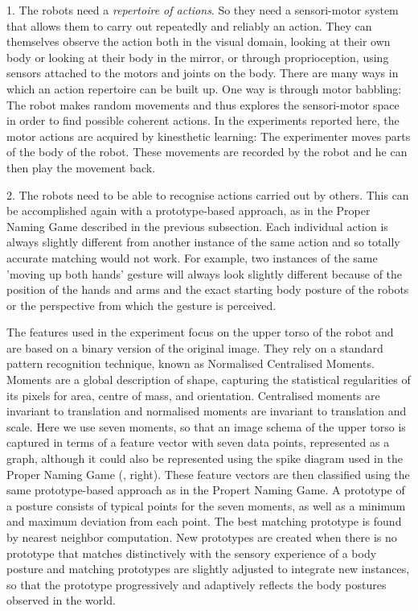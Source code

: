 1. The robots need a {\itshape repertoire of actions}. So they need a sensori-motor system that allows them to carry out 
repeatedly and reliably an action. They can themselves observe the action both in the visual domain,  
looking at their own body or looking at their body in the mirror, or through proprioception, using sensors attached 
to the motors and joints on the body. There are many ways in which an action repertoire can be built up. One way 
is through motor babbling: The robot makes random movements and thus explores the sensori-motor 
space in order to find possible coherent actions. In the experiments reported here, the motor actions are acquired 
by kinesthetic learning: The experimenter moves parts of the body of the robot. These movements are recorded by the robot
and he can then play the movement back. 

2. The robots need to be able to recognise actions carried out by others. This can be accomplished again 
with a prototype-based approach, as in the Proper Naming Game described in the previous subsection. Each individual action 
is always slightly different from another instance of the same action and so totally accurate matching would not work. 
For example, two instances of the same 'moving up both hands' gesture will always look slightly different because of the 
position of the hands and arms and the exact starting body posture of the robots or the perspective from which 
the gesture is perceived. 

The features used in the experiment focus on the upper torso of the robot and are based on a binary 
version of the original image. They rely on a standard pattern recognition technique, known as Normalised 
Centralised Moments.\cite{Hu:1962} 
Moments are a global description of shape, capturing the statistical regularities
of its pixels for area, centre of mass, and orientation. Centralised moments are invariant to translation and 
normalised moments are invariant to translation and scale. Here we use seven moments, so that an image schema of 
the upper torso is captured in terms of a feature vector with seven data points, represented as a graph, 
although it could also be represented using the spike diagram used in the Proper Naming Game (, right). 
These feature vectors are then classified using the same prototype-based approach as in the Propert Naming Game. A prototype of a posture 
consists of typical points for the seven moments, as well as a minimum and maximum deviation from 
each point. The best matching prototype is found by nearest neighbor computation. New prototypes are created 
when there is no prototype that matches distinctively with the sensory experience of a body posture and matching prototypes are
slightly adjusted to integrate new instances, so that the prototype progressively and adaptively reflects the body postures observed
in the world. 


